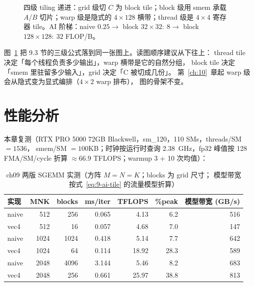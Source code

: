 \begin{figure}[htbp]
\caption{四级 tiling 递进：grid 级切 $C$ 为 block tile；block 级用 smem 承载 $A$/$B$ 切片；warp 级是隐式的 $4\times128$ 横带；thread 级是 $4\times4$ 寄存器 tile。AI 阶梯：naive $0.25 \to$ block $32{\times}32{:}\ 8 \to$ block $128{\times}128{:}\ 32$ FLOP/B。}
\label{fig:9-1}
\end{figure}

图~\ref{fig:9-1} 把 9.3 节的三级公式落到同一张图上。读图顺序建议从下往上：
thread tile 决定「每个线程负责多少输出」，warp 横带是它的自然分组，
block tile 决定「smem 里驻留多少输入」，grid 决定「C 被切成几份」。
第~\ref{ch:10}~章起 warp 级会从隐式变为显式编排（$4 \times 2$ warp 排布），
图的骨架不变。

\section{性能分析}

本章复测（RTX PRO 5000 72GB Blackwell，sm\_120，110 SMs，threads/SM $=1536$，
smem/SM $=100$KB；时钟按运行时查询 2.38~GHz，fp32 峰值按 128 FMA/SM/cycle 折算
$\approx 66.9$ TFLOPS；warmup 3 + 10 次均值）：

\begin{table}[htbp]
\centering
\caption{ch09 两版 SGEMM 实测（方阵 $M{=}N{=}K$；blocks 为 grid 尺寸；
模型带宽按式~\ref{eq:9-ai-tile} 的流量模型折算）}
\label{tab:9-bench}
\begin{tabular}{lrrrrrr}
\toprule
实现 & MNK & blocks & ms/iter & TFLOPS & \%peak & 模型带宽 (GB/s) \\
\midrule
naive & 512  & 256  & 0.065 & 4.13  & 6.2  & 516 \\
vec4  & 512  & 16   & 0.057 & 4.68  & 7.0  & 147 \\
naive & 1024 & 1024 & 0.418 & 5.14  & 7.7  & 642 \\
vec4  & 1024 & 64   & 0.114 & 18.92 & 28.3 & 589 \\
naive & 2048 & 4096 & 3.144 & 5.46  & 8.2  & 683 \\
vec4  & 2048 & 256  & 0.661 & 25.97 & 38.8 & 813 \\
\bottomrule
\end{tabular}
\end{table}

